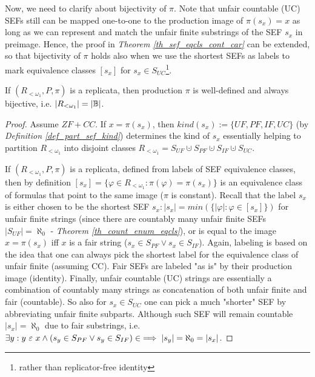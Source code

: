 Now, we need to clarify about bijectivity of $\pi$. Note that unfair countable (UC) SEFs still can be mapped one-to-one to the production image of $\pi(s_x) = x$ as long as we can represent and match the unfair finite substrings of the SEF $s_x$ in preimage. Hence, the proof in \textit{Theorem \ref{th_sef_eqcls_cont_car}} can be extended, so that bijectivity of $\pi$ holds also when we use the shortest SEFs as labels to mark equivalence classes $[s_x]$ for $s_x \in S_{UC}$\footnote{rather than replicator-free identity}.

\begin{lemma}[Bijectivity of $\pi$]\label{lemma_biject_pi}
  If $(R_{<\omega_1}, P, \pi)$ is a replicata, then production $\pi$ is well-defined and always bijective, i.e. $|R_{<\omega_1}| = |\mathbb{B}|$.
\end{lemma}
\begin{proof}
  Assume $ZF + CC$. If $x = \pi(s_x)$, then $kind(s_x) := \{UF, PF, IF, UC\}$ (by \textit{Definition \ref{def_part_sef_kind}}) determines the kind of $s_x$ essentially helping to partition $R_{<\omega_1}$ into disjoint classes $R_{<\omega_1} = S_{UF} \cupdot S_{PF} \cupdot S_{IF} \cupdot S_{UC}$.
  
  If $(R_{<\omega_1}, P, \pi)$ is a replicata, defined from labels of SEF equivalence classes, then by definition $[s_x] = \{\varphi \in R_{<\omega_1}: \pi(\varphi) = \pi(s_x) \}$ is an equivalence class of formulas that point to the same image ($\pi$ is constant). Recall that the label $s_x$ is either chosen to be the shortest SEF $s_x: |s_x| = min(\{|\varphi|: \varphi \in [s_x]\})$ for unfair finite strings (since there are countably many unfair finite SEFs $|S_{UF}| = \aleph_0$ - \textit{Theorem \ref{th_count_enum_eqcls}}), or is equal to the image $x = \pi(s_x)$ iff $x$ is a fair string ($s_x \in S_{PF} \lor s_x \in S_{IF}$). Again, labeling is based on the idea that one can always pick the shortest label for the equivalence class of unfair finite (assuming CC). Fair SEFs are labeled "as is" by their production image (identity). Finally, unfair countable (UC) strings are essentially a combination of countably many strings as concatenation of both unfair finite and fair (countable). So also for $s_x \in S_{UC}$ one can pick a much "shorter" SEF by abbreviating unfair finite subparts. Although such SEF will remain countable $|s_x| = \aleph_0$ due to fair substrings, i.e. $\exists y: y \ \varepsilon\  x \land (s_y \in S_{PF} \lor s_y \in S_{IF}) \in \implies |s_y| = \aleph_0 = |s_x|$.


\end{proof}
